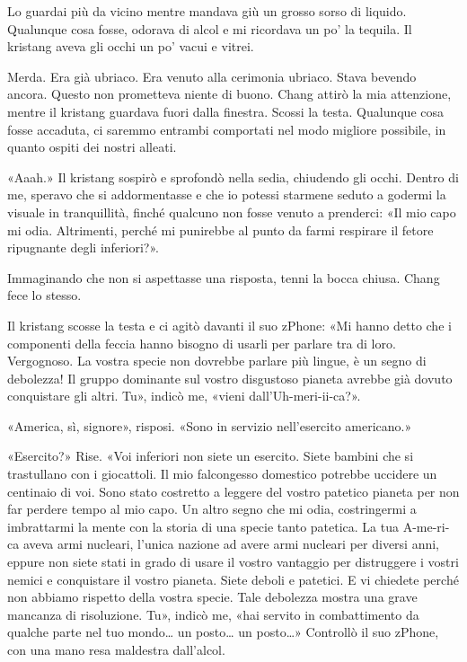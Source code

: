 Lo guardai più da vicino mentre mandava giù un grosso sorso di liquido.
Qualunque cosa fosse, odorava di alcol e mi ricordava un po' la tequila.
Il kristang aveva gli occhi un po' vacui e vitrei.

Merda. Era già ubriaco. Era venuto alla cerimonia ubriaco. Stava bevendo
ancora. Questo non prometteva niente di buono. Chang attirò la mia
attenzione, mentre il kristang guardava fuori dalla finestra. Scossi la
testa. Qualunque cosa fosse accaduta, ci saremmo entrambi comportati nel
modo migliore possibile, in quanto ospiti dei nostri alleati.

«Aaah.» Il kristang sospirò e sprofondò nella sedia, chiudendo gli
occhi. Dentro di me, speravo che si addormentasse e che io potessi
starmene seduto a godermi la visuale in tranquillità, finché qualcuno
non fosse venuto a prenderci: «Il mio capo mi odia. Altrimenti, perché
mi punirebbe al punto da farmi respirare il fetore ripugnante degli
inferiori?».

Immaginando che non si aspettasse una risposta, tenni la bocca chiusa.
Chang fece lo stesso.

Il kristang scosse la testa e ci agitò davanti il suo zPhone: «Mi hanno
detto che i componenti della feccia hanno bisogno di usarli per parlare
tra di loro. Vergognoso. La vostra specie non dovrebbe parlare più
lingue, è un segno di debolezza! Il gruppo dominante sul vostro
disgustoso pianeta avrebbe già dovuto conquistare gli altri. Tu», indicò
me, «vieni dall'Uh-meri-ii-ca?».

«America, sì, signore», risposi. «Sono in servizio nell'esercito
americano.»

«Esercito?» Rise. «Voi inferiori non siete un esercito. Siete bambini
che si trastullano con i giocattoli. Il mio falcongesso domestico
potrebbe uccidere un centinaio di voi. Sono stato costretto a leggere
del vostro patetico pianeta per non far perdere tempo al mio capo. Un
altro segno che mi odia, costringermi a imbrattarmi la mente con la
storia di una specie tanto patetica. La tua A-me-ri-ca aveva armi
nucleari, l'unica nazione ad avere armi nucleari per diversi anni,
eppure non siete stati in grado di usare il vostro vantaggio per
distruggere i vostri nemici e conquistare il vostro pianeta. Siete
deboli e patetici. E vi chiedete perché non abbiamo rispetto della
vostra specie. Tale debolezza mostra una grave mancanza di risoluzione.
Tu», indicò me, «hai servito in combattimento da qualche parte nel tuo
mondo\ldots{} un posto\ldots{} un posto\ldots» Controllò il suo zPhone,
con una mano resa maldestra dall'alcol.

